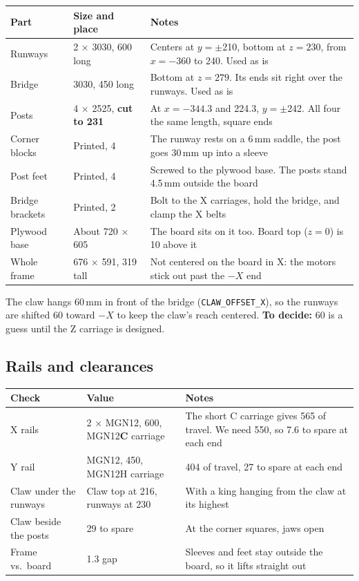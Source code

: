 \documentclass[10pt]{article}
\newcommand{\mm}{\,mm}
\newcommand{\todo}[1]{\textcolor{red!70!black}{\textbf{To decide:} #1}}
\begin{document}
\begin{tabularx}{\textwidth}{l l L}
\toprule
Part & Size and place & Notes \\
\midrule
Runways & 2 $\times$ 3030, 600 long & Centers at $y = \pm$210, bottom at $z = 230$, from $x = -360$ to 240. Used as is \\
Bridge & 3030, 450 long & Bottom at $z = 279$. Its ends sit right over the runways. Used as is \\
Posts & 4 $\times$ 2525, \textbf{cut to 231} & At $x = -344.3$ and 224.3, $y = \pm$242. All four the same length, square ends \\
Corner blocks & Printed, 4 & The runway rests on a 6\mm{} saddle, the post goes 30\mm{} up into a sleeve \\
Post feet & Printed, 4 & Screwed to the plywood base. The posts stand 4.5\mm{} outside the board \\
Bridge brackets & Printed, 2 & Bolt to the X carriages, hold the bridge, and clamp the X belts \\
Plywood base & About 720 $\times$ 605 & The board sits on it too. Board top ($z = 0$) is 10 above it \\
Whole frame & 676 $\times$ 591, 319 tall & Not centered on the board in X: the motors stick out past the $-X$ end \\
\bottomrule
\end{tabularx}

The claw hangs 60\mm{} in front of the bridge (\texttt{CLAW\_OFFSET\_X}), so the runways are shifted
60 toward $-X$ to keep the claw's reach centered. \todo{60 is a guess until the Z carriage is designed.}

\subsection{Rails and clearances}

\begin{tabularx}{\textwidth}{l l L}
\toprule
Check & Value & Notes \\
\midrule
X rails & 2 $\times$ MGN12, 600, MGN12\textbf{C} carriage & The short C carriage gives 565 of travel. We need 550, so 7.6 to spare at each end \\
Y rail & MGN12, 450, MGN12H carriage & 404 of travel, 27 to spare at each end \\
Claw under the runways & Claw top at 216, runways at 230 & With a king hanging from the claw at its highest \\
Claw beside the posts & 29 to spare & At the corner squares, jaws open \\
Frame vs.\ board & 1.3 gap & Sleeves and feet stay outside the board, so it lifts straight out \\
\bottomrule
\end{tabularx}
\end{document}
